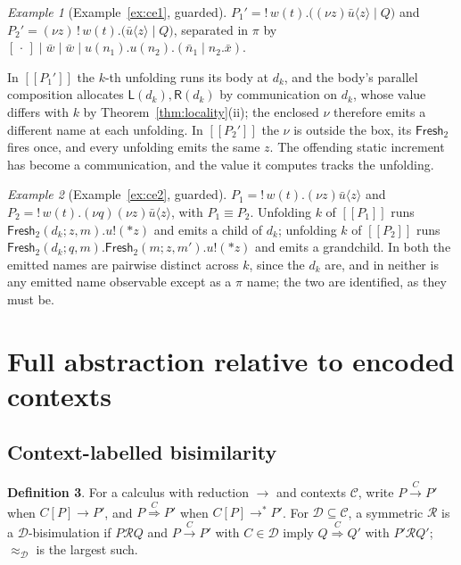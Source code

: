 \documentclass[11pt]{article}
\theoremstyle{definition}
\newtheorem{definition}{Definition}[section]
\theoremstyle{plain}
\theoremstyle{remark}
\newtheorem{example}[definition]{Example}
\newcommand{\drp}[1]{{*}#1}
\newcommand{\out}[2]{#1!(#2)}
\newcommand{\enc}[1]{[\![#1]\!]}
\newcommand{\Lft}{\mathsf{L}}
\newcommand{\Rgt}{\mathsf{R}}
\newcommand{\Frsh}{\mathsf{Fresh}_2}
\newcommand{\Ctx}{\mathscr{C}}
\newcommand{\Obs}{\mathcal{D}}
\newcommand{\bisim}{\approx}
\providecommand{\xLongrightarrow}[1]{\mathrel{\overset{#1}{\Longrightarrow}}}
\begin{document}
\begin{example}[Example~\ref{ex:ce1}, guarded]
$P_1' = !\,w(t).\big((\nu z)\bar u\langle z\rangle \mid Q\big)$ and
$P_2' = (\nu z)\,!\,w(t).\big(\bar u\langle z\rangle \mid Q\big)$,
separated in $\pi$ by
$[\,\cdot\,] \mid \bar w \mid \bar w \mid u(n_1).u(n_2).(\bar n_1 \mid n_2.\bar x)$.

In $\enc{P_1'}$ the $k$-th unfolding runs its body at $d_k$, and the
body's parallel composition allocates $\Lft(d_k), \Rgt(d_k)$ by
communication on $d_k$, whose value differs with $k$ by
Theorem~\ref{thm:locality}(ii); the enclosed $\nu$ therefore emits a
different name at each unfolding. In $\enc{P_2'}$ the $\nu$ is outside
the box, its $\Frsh$ fires once, and every unfolding emits the same $z$.
The offending static increment has become a communication, and the value
it computes tracks the unfolding.
\end{example}

\begin{example}[Example~\ref{ex:ce2}, guarded]
$P_1 = !\,w(t).(\nu z)\bar u\langle z\rangle$ and
$P_2 = !\,w(t).(\nu q)(\nu z)\bar u\langle z\rangle$, with
$P_1 \equiv P_2$. Unfolding $k$ of $\enc{P_1}$ runs
$\Frsh(d_k;z,m).\out{u}{\drp{z}}$ and emits a child of $d_k$; unfolding
$k$ of $\enc{P_2}$ runs $\Frsh(d_k;q,m).\Frsh(m;z,m').\out{u}{\drp{z}}$
and emits a grandchild. In both the emitted names are pairwise distinct
across $k$, since the $d_k$ are, and in neither is any emitted name
observable except as a $\pi$ name; the two are identified, as they must
be.
\end{example}

\section{Full abstraction relative to encoded contexts}\label{sec:fullabs}

\subsection{Context-labelled bisimilarity}

\begin{definition}
For a calculus with reduction $\to$ and contexts $\Ctx$, write
$P \xrightarrow{\,C\,} P'$ when $C[P] \to P'$, and
$P \xLongrightarrow{\,C\,} P'$ when $C[P] \to^* P'$. For
$\Obs \subseteq \Ctx$, a symmetric $\mathcal{R}$ is a
$\Obs$-bisimulation if $P \mathrel{\mathcal{R}} Q$ and
$P \xrightarrow{\,C\,} P'$ with $C \in \Obs$ imply
$Q \xLongrightarrow{\,C\,} Q'$ with $P' \mathrel{\mathcal{R}} Q'$;
$\bisim_\Obs$ is the largest such.
\end{definition}
\end{document}
